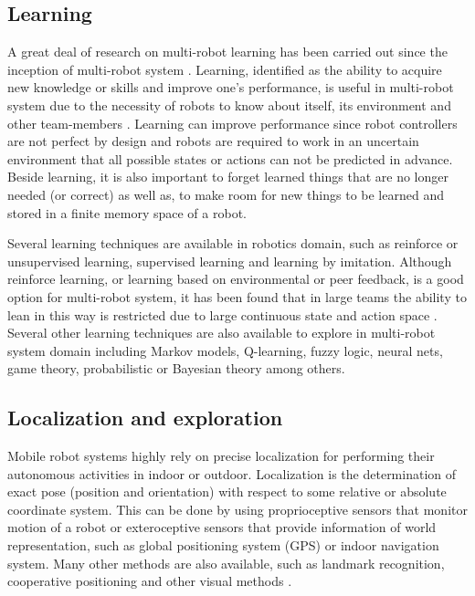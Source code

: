 \subsection*{Learning}
\label{bg:mrs:learn}
A great deal of research on multi-robot learning has been carried out since the inception of multi-robot system \cite{Mataric+2001,Parker1995}. Learning, identified as the ability to acquire new knowledge or skills and improve one's performance, is useful in multi-robot system due to the necessity of robots to know about itself, its environment and other team-members \cite{Mataric2007}. Learning can improve performance since robot controllers are not perfect by design and robots are required to work in an uncertain environment that all possible states or actions can not be predicted in advance. Beside learning, it is also important to forget learned things that are no longer needed (or correct) as well as, to make room for new things to be learned and stored in a finite memory space of a robot. 

Several learning techniques are available in robotics domain, such as reinforce or unsupervised learning, supervised learning and learning by imitation. Although reinforce learning, or learning based on environmental or peer feedback, is a good option for multi-robot system, it has been found that in large teams the ability to lean in this way is restricted due to large continuous state and action space \cite{Yang+2004}. Several other learning techniques are also available to explore in multi-robot system domain including Markov models, Q-learning, fuzzy logic, neural nets, game theory, probabilistic or Bayesian theory among others. 
\subsection*{Localization and exploration}
\label{bg:mrs:loc}
Mobile robot systems highly rely on precise localization for performing their autonomous activities in indoor or outdoor. Localization is the determination of exact pose (position and orientation) with respect to some relative or absolute coordinate system. This can be done by using proprioceptive sensors that monitor motion of a robot or exteroceptive sensors that provide information of world representation, such as  global positioning system (GPS) or indoor navigation system. Many other methods are also available, such as landmark recognition, cooperative positioning and other visual methods \cite{Arkin+2002}.

